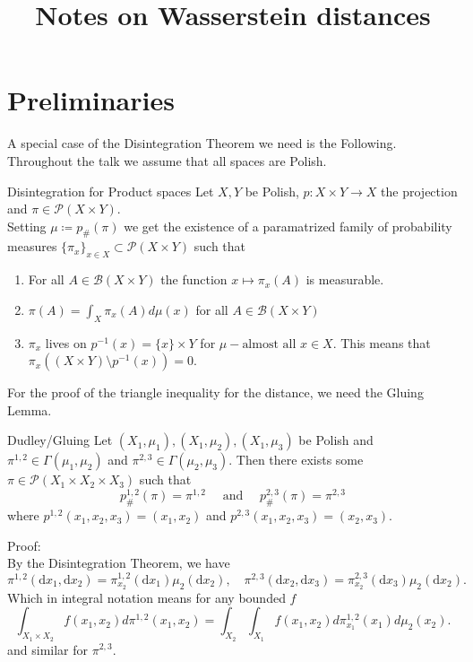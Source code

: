 \documentclass[15pt]{article}
\title{Notes on Wasserstein distances}
\author{ }
\date{}
\makeatletter
\newcommand{\mathleft}{\@fleqntrue\@mathmargin10pt}
\makeatother
\begin{document}
\maketitle

\newlength\breite
\setlength\breite{\linewidth-4pt}
\setlength\fboxsep{0pt}
\setlength\fboxrule{0.25pt}
\setlength{\abovedisplayskip}{3mm} %
\setlength{\belowdisplayskip}{3mm} %
\setlength\itemsep{0pt}
\setlength\parindent{0pt}


\mathleft

\section*{Preliminaries}

A special case of the Disintegration Theorem we need is the Following. 
Throughout the talk we assume that all spaces are Polish. 
\begin{theorem}{Disintegration for Product spaces}{}
Let $X,Y$ be Polish, $p : X \times Y \rightarrow X$ the projection and $\pi \in \mathcal{P}(X \times Y)$. \\ 
Setting $\mu \coloneqq p_{\#}(\pi)$ we get the existence of a paramatrized family of probability measures $\{\pi_x\}_{x \in X} \subset \mathcal{P}(X \times Y)$ such that
\begin{enumerate}
\item For all $A \in \mathcal{B}(X \times Y)$ the function $x \mapsto \pi_x(A)$ is measurable.
\item $\pi(A) = \int_X \pi_x(A) d\mu(x)$ for all $A \in \mathcal{B}(X \times Y)$
\item $\pi_x$ lives on $p^{-1}(x) = \{x\} \times Y$ for $\mu-\text{almost all } x \in X.$ This means that $\pi_x((X \times Y) \setminus p^{-1}(x)) = 0.$
\end{enumerate} 
\end{theorem}

For the proof of the triangle inequality for the distance, we need the Gluing Lemma. 
\begin{lemma}{Dudley/Gluing}{}
Let $(X_1,\mu_1), (X_1,\mu_2),(X_1,\mu_3)$ be Polish and $\pi^{1,2} \in \Gamma(\mu_1,\mu_2)$ and $\pi^{2,3} \in \Gamma(\mu_2,\mu_3)$. 
Then there exists some $\pi \in \mathcal{P}(X_1 \times X_2 \times X_3)$ such that $$p_{\#}^{1,2}(\pi) = \pi^{1,2} \quad \text{ and } \quad p_{\#}^{2,3}(\pi) = \pi^{2,3}$$ where $p^{1,2}(x_1,x_2,x_3) = (x_1,x_2)$ and $p^{2,3}(x_1,x_2,x_3) = (x_2,x_3).$ 
\end{lemma}
Proof: 
\vspace{0.3cm} \\
By the Disintegration Theorem, we have $$\pi^{1,2}(\mathrm{d}x_1,\mathrm{d}x_2)=\pi_{x_2}^{1,2}(\mathrm{d}x_1)\mu_2(\mathrm{d}x_2),\quad\pi^{2,3}(\mathrm{d}x_2,\mathrm{d}x_3)=\pi_{x_2}^{2,3}(\mathrm{d}x_3)\mu_2(\mathrm{d}x_2).$$ 
Which in integral notation means for any bounded $f$ $$\int_{X_1 \times X_2} f(x_1,x_2) d\pi^{1,2}(x_1,x_2) = \int_{X_2} \int_{X_1} f(x_1,x_2) d\pi_{x_1}^{1,2}(x_1) d\mu_2(x_2).$$ and similar for $\pi^{2,3}$.
\end{document}
